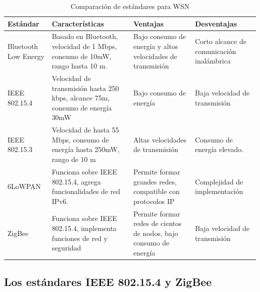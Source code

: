 \begin{table}
	\begin{center}
		
		\caption{Comparación de estándares para WSN}
		\label{tabla:estandares}
		\small
		\begin{tabular}{p{2.1cm}p{4cm}p{3.2cm}p{3.2cm}}
		
		\toprule
		\textbf{Estándar} & \textbf{Características} & \textbf{Ventajas} & \textbf{Desventajas}\\
		\midrule
		Bluetooth Low Energy & Basado en Bluetooth, velocidad de 1 Mbps, consumo de 10mW, rango hasta 10 m. & Bajo consumo de energía y altos velocidades de transmisión & Corto alcance de comunicación inalámbrica\\
		IEEE 802.15.4 & Velocidad de transmisión hasta 250 kbps, alcance 75m, consumo de energía 30mW & Bajo consumo de energía & Baja velocidad de transmisión\\
		IEEE 802.15.3 & Velocidad de hasta 55 Mbps, consumo de energía hasta 250mW, rango de 10 m & Altas velocidades de transmisión & Consumo de energía elevado.\\
		6LoWPAN & Funciona sobre IEEE 802.15.4, agrega funcionalidades de red IPv6. & Permite formar grandes redes, compatible con protocolos IP & Complejidad de implementación\\
		ZigBee & Funciona sobre IEEE 802.15.4, implementa funciones de red y seguridad & Permite formar redes de cientos de nodos, bajo consumo de energía & Baja velocidad de transmisión\\
		\bottomrule		
		\end{tabular}
	\end{center}
\end{table}


\subsection{Los est\'andares IEEE 802.15.4 y ZigBee}



